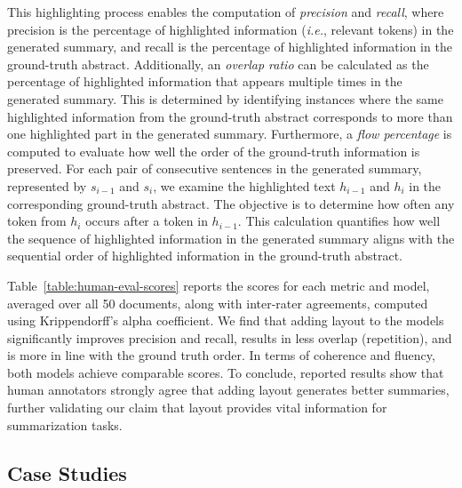 This highlighting process enables the computation of \textit{precision} and \textit{recall}, where precision is the percentage of highlighted information (\textit{i.e.}, relevant tokens) in the generated summary, and recall is the percentage of highlighted information in the ground-truth abstract. Additionally, an \textit{overlap ratio} can be calculated as the percentage of highlighted information that appears multiple times in the generated summary. This is determined by identifying instances where the same highlighted information from the ground-truth abstract corresponds to more than one highlighted part in the generated summary. Furthermore, a \textit{flow percentage} is computed to evaluate how well the order of the ground-truth information is preserved. For each pair of consecutive sentences in the generated summary, represented by $s_{i-1}$ and $s_i$, we examine the highlighted text $h_{i-1}$ and $h_i$ in the corresponding ground-truth abstract. The objective is to determine how often any token from $h_i$ occurs after a token in $h_{i-1}$. This calculation quantifies how well the sequence of highlighted information in the generated summary aligns with the sequential order of highlighted information in the ground-truth abstract.

Table~\ref{table:human-eval-scores} reports the scores for each metric and model, averaged over all 50 documents, along with inter-rater agreements, computed using Krippendorff's alpha coefficient. We find that adding layout to the models significantly improves precision and recall, results in less overlap (repetition), and is more in line with the ground truth order. In terms of coherence and fluency, both models achieve comparable scores. To conclude, reported results show that human annotators strongly agree that adding layout generates better summaries, further validating our claim that layout provides vital information for summarization tasks.

\subsection{Case Studies}

